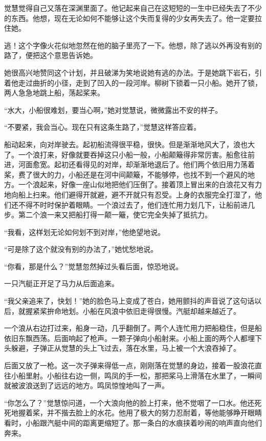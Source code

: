 \par 觉慧觉得自己又落在深渊里面了。他记起来自己在这短短的一生中已经失去了不少的东西。他想，现在无论如何不能够让这个失而复得的少女再失去了。他一定要拉住她。
\par 逃！这个字像火花似地忽然在他的脑子里亮了一下。他想，除了逃以外再没有别的路了，便把这个意思告诉她。
\par 她很高兴地赞同这个计划，并且破涕为笑地说她有逃的办法。于是她跳下岩石，引着他走过曲折的小径，走到了凹入的一段河岸。柳树下锁着一只小船。她开了锁，两人急急地跳上船，荡起桨来。
\par “水大，小船很难划，要当心啊，”她对觉慧说，微微露出不安的样子。
\par “不要紧，我会当心。现在只有这条生路了，”觉慧这样答应着。
\par 船动起来，向对岸驶去。起初船流得很平稳，很快。但是渐渐地风大了，浪也大了。一个浪打来，好像就要吞掉这只小船一般，小船颠簸得非常厉害。船愈往前进，河面愈宽。起初还看得见的对岸，却渐渐地退后了。他们两个依旧用力荡着桨，费了很大的力，小船还是在河中间颠簸，不能够停，也找不到一个避风的地方。一个浪起来，好像一座山似地把他们压倒了。接着顶上冒出来的白浪花又有力地向船上扫来。他们避得开就避，避不开就只有忍受。上身的衣服完全打湿了，他们还不得不时时保护着眼睛。一个浪过去了，他们连忙用力划几下，让船前进几步。第二个浪一来又把船打得一颠一簸，使它完全失掉了抵抗力。
\par “我看，这样划无论如何划不到对岸，”他绝望地说。
\par “可是除了这个就没有别的办法了，”她忧愁地说。
\par “你看，那是什么？”觉慧忽然掉过头看后面，惊恐地说。
\par 一只汽艇正开足了马力从后面追来。
\par “我父亲追来了，快划！”她的脸色马上变成了苍白，她用颤抖的声音说了这句话以后，就握紧桨拚命地划。小船在风浪中依旧走得很慢。汽艇却越来越近了。
\par 一个浪从右边打过来，船身一动，几乎翻倒了。两个人连忙用力把船稳住，但是船依旧东飘西荡。后面响起了枪声。一颗子弹向小船射来。小船上面的两个人都埋下头躲避，子弹正从觉慧的头上飞过去，落在水里，马上被一个大浪吞掉了。
\par 后面又放了一枪。这一次子弹来得低一点，刚刚落在觉慧的身边，接着一股浪花直往小船里射。小船往右边一侧，鸣凤的手一松，那把桨马上滑落在水里了，一瞬间就被波浪送到了远远的地方。鸣凤惊惶地叫了一声。
\par “你怎么了？”觉慧惊问道，一个大浪向他的脸上打来，他不觉咽了一口水。他还死死地握着桨，并不揩去脸上的水花。他用了极大的努力忍耐着，等他能够睁开眼睛看时，小船跟汽艇中间的距离更缩短了。那一条白的水痕挟着吵闹的响声直向他们奔来。
